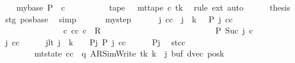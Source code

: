 \begin{isabellebody}
\ \ \isamarkupfalse%
\ mybase{\isacharcolon}{\kern0pt}\ {\isachardoublequoteopen}{\isacharquery}{\kern0pt}P\ {}\ c{}{\isachardoublequoteclose}\isanewline
\ \ \isamarkupfalse%
\ {\isacharminus}{\kern0pt}\isanewline
\ \ \ \ \isamarkupfalse%
\ {\isachardoublequoteopen}{\isacharquery}{\kern0pt}tape\ {}\ {\isacharequal}{\kern0pt}\ mt{\isacharunderscore}{\kern0pt}tape\ c{}\ tk{\isachardoublequoteclose}\ \isamarkupfalse%
\ {\isacharparenleft}{\kern0pt}rule\ ext{\isacharparenright}{\kern0pt}\ auto\isanewline
\ \ \ \ \isamarkupfalse%
\ {\isacharquery}{\kern0pt}thesis\ \isamarkupfalse%
\ stg\ pos{\isacharunderscore}{\kern0pt}base\ \isamarkupfalse%
\ simp\isanewline
\ \ \isamarkupfalse%
\isanewline
\ \ \isamarkupfalse%
\ mystep{\isacharcolon}{\kern0pt}\isanewline
\ \ \ \ \ \ {\isachardoublequoteopen}{\isasymAnd}j\ cc{\isachardot}{\kern0pt}\ {\isasymlbrakk}\ j\ {\isacharless}{\kern0pt}\ {\isacharquery}{\kern0pt}k\ {\isacharminus}{\kern0pt}\ {}{\isacharsemicolon}{\kern0pt}\ {\isacharquery}{\kern0pt}P\ j\ cc\ {\isasymrbrakk}\isanewline
\ \ \ \ \ \ \ \ \ \ \ \ \ \ {\isasymLongrightarrow}\ {\isasymexists}c{\isacharprime}{\kern0pt}{\isacharprime}{\kern0pt}{\isachardot}{\kern0pt}\ {\isacharparenleft}{\kern0pt}cc{\isacharcomma}{\kern0pt}\ c{\isacharprime}{\kern0pt}{\isacharprime}{\kern0pt}{\isacharparenright}{\kern0pt}\ {\isasymin}\ R{\isacharprime}{\kern0pt}\isanewline
\ \ \ \ \ \ \ \ \ \ \ \ \ \ \ \ \ \ \ \ \ \ \ \ \ \ {\isasymand}\ {\isacharquery}{\kern0pt}P\ {\isacharparenleft}{\kern0pt}Suc\ j{\isacharparenright}{\kern0pt}\ c{\isacharprime}{\kern0pt}{\isacharprime}{\kern0pt}{\isachardoublequoteclose}\isanewline
\ \ \isamarkupfalse%
\ {\isacharminus}{\kern0pt}\isanewline
\ \ \ \ \isamarkupfalse%
\ j\ cc\isanewline
\ \ \ \ \isamarkupfalse%
\ jlt{\isacharcolon}{\kern0pt}\ {\isachardoublequoteopen}j\ {\isacharless}{\kern0pt}\ {\isacharquery}{\kern0pt}k\ {\isacharminus}{\kern0pt}\ {}{\isachardoublequoteclose}\ \ Pj{\isacharcolon}{\kern0pt}\ {\isachardoublequoteopen}{\isacharquery}{\kern0pt}P\ j\ cc{\isachardoublequoteclose}\isanewline
\ \ \ \ \isamarkupfalse%
\ Pj\ \isamarkupfalse%
\ st{\isacharunderscore}{\kern0pt}cc{\isacharcolon}{\kern0pt}\isanewline
\ \ \ \ \ \ \ \ {\isachardoublequoteopen}mt{\isacharunderscore}{\kern0pt}state\ cc\ {\isacharequal}{\kern0pt}\ {\isacharparenleft}{\kern0pt}q{\isacharcomma}{\kern0pt}\ AR{\isacharunderscore}{\kern0pt}SimWrite{\isacharcomma}{\kern0pt}\ tk{\isacharcomma}{\kern0pt}\ {\isacharquery}{\kern0pt}k\ {\isacharplus}{\kern0pt}\ j{\isacharcomma}{\kern0pt}\ buf{\isacharcomma}{\kern0pt}\ dvec{\isacharcomma}{\kern0pt}\ posk{\isacharparenright}{\kern0pt}{\isachardoublequoteclose}\isanewline

\end{isabellebody}
